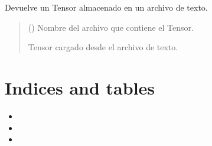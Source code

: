 \documentclass[letterpaper,10pt,english]{sphinxmanual}
\begin{document}
\begin{fulllineitems}
\label{\detokenize{utils.tensor:utils.tensor.load_tensor}}
\pysigstartsignatures
{}
\pysigstopsignatures
\sphinxAtStartPar
Devuelve un Tensor almacenado en un archivo de texto.
\begin{quote}\begin{description}
\sphinxAtStartPar
{} () \textendash{} Nombre del archivo que contiene el Tensor.

\sphinxAtStartPar
Tensor cargado desde el archivo de texto.

\sphinxAtStartPar
{\hyperref[\detokenize{utils.tensor:utils.tensor.Tensor}]{}}

\end{description}\end{quote}

\end{fulllineitems}



\chapter{Indices and tables}
\label{\detokenize{index:indices-and-tables}}\begin{itemize}
\item {} 
\sphinxAtStartPar
{}

\item {} 
\sphinxAtStartPar
{}

\item {} 
\sphinxAtStartPar
{}

\end{itemize}
\end{document}
